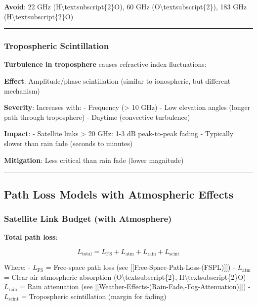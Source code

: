 \textbf{Avoid}: 22 GHz (H\textbackslash textsubscript\{2\}O), 60 GHz
(O\textbackslash textsubscript\{2\}), 183 GHz
(H\textbackslash textsubscript\{2\}O)

\begin{center}\rule{0.5\linewidth}{0.5pt}\end{center}

\subsubsection{Tropospheric
Scintillation}\label{tropospheric-scintillation}

\textbf{Turbulence in troposphere} causes refractive index fluctuations:

\textbf{Effect}: Amplitude/phase scintillation (similar to ionospheric,
but different mechanism)

\textbf{Severity}: Increases with: - Frequency (\textgreater{} 10 GHz) -
Low elevation angles (longer path through troposphere) - Daytime
(convective turbulence)

\textbf{Impact}: - Satellite links \textgreater{} 20 GHz: 1-3 dB
peak-to-peak fading - Typically slower than rain fade (seconds to
minutes)

\textbf{Mitigation}: Less critical than rain fade (lower magnitude)

\begin{center}\rule{0.5\linewidth}{0.5pt}\end{center}

\subsection{Path Loss Models with Atmospheric
Effects}\label{path-loss-models-with-atmospheric-effects}

\subsubsection{Satellite Link Budget (with
Atmosphere)}\label{satellite-link-budget-with-atmosphere}

\textbf{Total path loss}:

\[
L_{\text{total}} = L_{\text{FS}} + L_{\text{atm}} + L_{\text{rain}} + L_{\text{scint}}
\]

Where: - \(L_{\text{FS}}\) = Free-space path loss (see
{[}{[}Free-Space-Path-Loss-(FSPL){]}{]}) - \(L_{\text{atm}}\) =
Clear-air atmospheric absorption (O\textbackslash textsubscript\{2\},
H\textbackslash textsubscript\{2\}O) - \(L_{\text{rain}}\) = Rain
attenuation (see
{[}{[}Weather-Effects-(Rain-Fade,-Fog-Attenuation){]}{]}) -
\(L_{\text{scint}}\) = Tropospheric scintillation (margin for fading)

